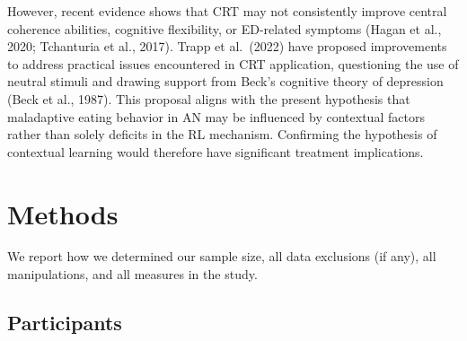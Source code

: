 \documentclass[
  man,floatsintext]{apa6}
\begin{document}
However, recent evidence shows that CRT may not consistently improve central coherence abilities, cognitive flexibility, or ED-related symptoms (Hagan et al., 2020; Tchanturia et al., 2017). Trapp et al.~(2022) have proposed improvements to address practical issues encountered in CRT application, questioning the use of neutral stimuli and drawing support from Beck's cognitive theory of depression (Beck et al., 1987). This proposal aligns with the present hypothesis that maladaptive eating behavior in AN may be influenced by contextual factors rather than solely deficits in the RL mechanism. Confirming the hypothesis of contextual learning would therefore have significant treatment implications.

\hypertarget{methods}{%
\section{Methods}\label{methods}}

We report how we determined our sample size, all data exclusions (if any), all manipulations, and all measures in the study.

\hypertarget{participants}{%
\subsection{Participants}\label{participants}}
\end{document}
